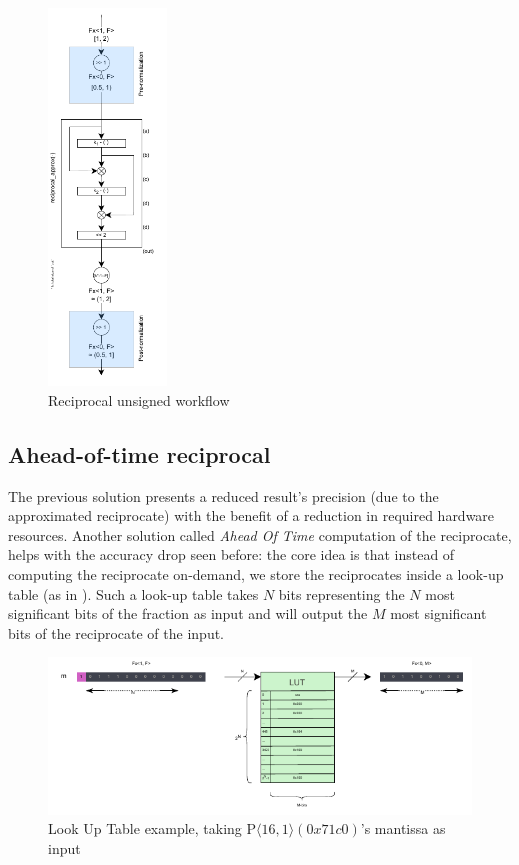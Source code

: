     

\begin{figure}
    \centering
    \includegraphics[width=0.28\textwidth]{figures/reciprocal_unsigned.drawio.pdf}
    \caption{Reciprocal unsigned workflow}
    \label{fig:reciprocal_unsigned_workflow}
\end{figure}

\subsection{Ahead-of-time reciprocal}\label{aot_reciprocal_lut_technique}

The previous solution presents a reduced result's precision (due to the approximated reciprocate) with the benefit of a reduction in required hardware resources.
Another solution called \textit{Ahead Of Time} computation of the reciprocate, helps with the accuracy drop seen before: the core idea is that instead of computing the reciprocate on-demand, we store the reciprocates inside a look-up table (as in \cite{PACoGen}). Such a look-up table takes $N$ bits representing the $N$ most significant bits of the fraction as input and will output the $M$ most significant bits of the reciprocate of the input.

\begin{figure}[h!]
    \begin{center}
    \includegraphics[width=1\textwidth]{figures/lut.drawio.pdf}
    \caption{Look Up Table example, taking P$\langle 16,1 \rangle(0x71c0)$'s mantissa as input}
    \label{fig:lut_drawio_example}
    \end{center}
\end{figure}


